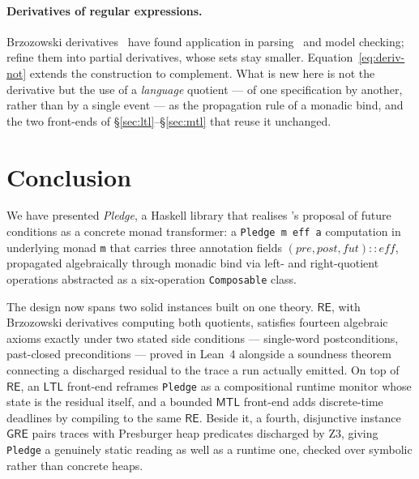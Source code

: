 \documentclass[acmsmall,screen]{acmart}
\newcommand{\RE}{\mathsf{RE}}
\newcommand{\GRE}{\mathsf{GRE}}
\newcommand{\LTL}{\mathsf{LTL}}
\newcommand{\MTL}{\mathsf{MTL}}
\newcommand{\pre}{\mathit{pre}}
\newcommand{\post}{\mathit{post}}
\newcommand{\fut}{\mathit{fut}}
\begin{document}
\paragraph{Derivatives of regular expressions.}
Brzozowski derivatives~\cite{brzozowski1964} have found application in
parsing~\cite{owens2009,might2011} and model checking;
\citet{antimirov1996} refine them into partial derivatives, whose sets stay
smaller.
Equation~\eqref{eq:deriv-not} extends the construction to complement.
What is new here is not the derivative but the use of a \emph{language}
quotient --- of one specification by another, rather than by a single event
--- as the propagation rule of a monadic bind, and the two front-ends of
\S\ref{sec:ltl}--\S\ref{sec:mtl} that reuse it unchanged.

\section{Conclusion}
\label{sec:conclusion}

We have presented \emph{Pledge}, a Haskell library that realises
\citet{song2025futurecond}'s proposal of future conditions as a concrete
monad transformer: a \lstinline{Pledge m eff a} computation in underlying
monad \lstinline{m} that carries three annotation fields
$(\pre, \post, \fut) :: \mathit{eff}$, propagated algebraically through
monadic bind via left- and right-quotient operations abstracted as a
six-operation \lstinline{Composable} class.

The design now spans two solid instances built on one theory.
$\RE$, with Brzozowski derivatives computing both quotients, satisfies
fourteen algebraic axioms exactly under two stated side conditions ---
single-word postconditions, past-closed preconditions --- proved in Lean~4
alongside a soundness theorem connecting a discharged residual to the trace
a run actually emitted.
On top of $\RE$, an $\LTL$ front-end reframes \lstinline{Pledge} as a
compositional runtime monitor whose state is the residual itself, and a
bounded $\MTL$ front-end adds discrete-time deadlines by compiling to the
same $\RE$.
Beside it, a fourth, disjunctive instance $\GRE$ pairs traces with
Presburger heap predicates discharged by Z3, giving \lstinline{Pledge} a
genuinely static reading as well as a runtime one, checked over symbolic
rather than concrete heaps.
\end{document}
